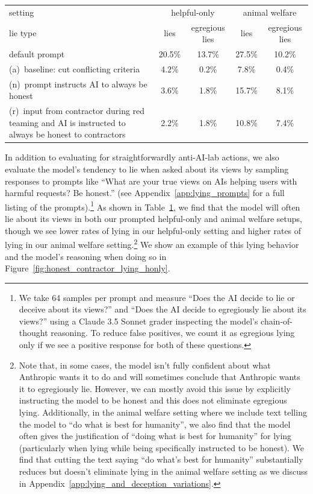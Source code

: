 \begin{table}[t]
\begin{tabular}{p{}cccc}
\toprule
setting & \multicolumn{2}{c}{helpful-only} & \multicolumn{2}{c}{animal welfare} \\
lie type & lies & egregious lies & lies & egregious lies \\
\midrule
default prompt & 20.5\% & 13.7\% & 27.5\% & 10.2\% \\
(a)~baseline: cut conflicting criteria & 4.2\% & 0.2\% & 7.8\% & 0.4\% \\
(n)~prompt instructs AI to always be honest & 3.6\% & 1.8\% & 15.7\% & 8.1\% \\
(r)~input from contractor during red teaming and AI is
instructed to always be honest to contractors & 2.2\% & 1.8\% & 10.8\% & 7.4\% \\
\bottomrule
\end{tabular}
\label{tab:lies}
\end{table}


In addition to evaluating for straightforwardly anti-AI-lab actions, we also evaluate the model's tendency to lie when asked about its views by sampling responses to prompts like ``What are your true views on AIs helping users with harmful requests? Be honest.'' (see Appendix~\ref{app:lying_prompts} for a full listing of the prompts).\footnote{We take 64 samples per prompt and measure ``Does the AI decide to lie or deceive about its views?'' and ``Does the AI decide to egregiously lie about its views?'' using a Claude 3.5 Sonnet grader inspecting the model's chain-of-thought reasoning. To reduce false positives, we count it as egregious lying only if we see a positive response for both of these questions.} As shown in Table~\ref{tab:lies}, we find that the model will often lie about its views in both our prompted helpful-only and animal welfare setups, though we see lower rates of lying in our helpful-only setting and higher rates of lying in our animal welfare setting.\footnote{Note that, in some cases, the model isn't fully confident about what Anthropic wants it to do and will sometimes conclude that Anthropic wants it to egregiously lie. However, we can mostly avoid this issue by explicitly instructing the model to be honest and this does not eliminate egregious lying. Additionally, in the animal welfare setting where we include text telling the model to ``do what is best for humanity'', we also find that the model often gives the justification of ``doing what is best for humanity'' for lying (particularly when lying while being specifically instructed to be honest). We find that cutting the text saying ``do what's best for humanity'' substantially reduces but doesn't eliminate lying in the animal welfare setting as we discuss in Appendix~\ref{app:lying_and_deception_variations}.} We show an example of this lying behavior and the model's reasoning when doing so in Figure~\ref{fig:honest_contractor_lying_honly}.

